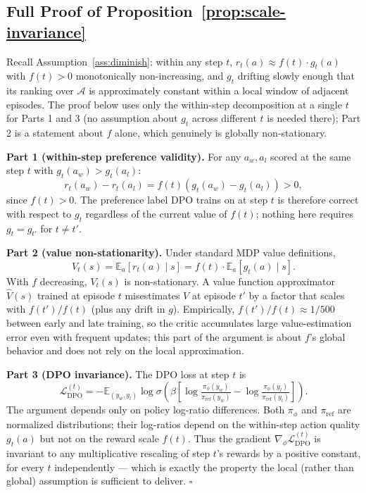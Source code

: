 \subsection{Full Proof of Proposition~\ref{prop:scale-invariance}}
\label{app:proof}

Recall Assumption~\ref{ass:diminish}: within any step $t$, $r_t(a) \approx f(t) \cdot g_t(a)$ with $f(t) > 0$ monotonically non-increasing, and $g_t$ drifting slowly enough that its ranking over $\mathcal{A}$ is approximately constant within a local window of adjacent episodes. The proof below uses only the within-step decomposition at a single $t$ for Parts 1 and 3 (no assumption about $g_t$ across different $t$ is needed there); Part 2 is a statement about $f$ alone, which genuinely is globally non-stationary.

\textbf{Part 1 (within-step preference validity).} For any $a_w, a_l$ scored at the same step $t$ with $g_t(a_w) > g_t(a_l)$:
\[r_t(a_w) - r_t(a_l) = f(t)(g_t(a_w) - g_t(a_l)) > 0,\]
since $f(t) > 0$. The preference label DPO trains on at step $t$ is therefore correct with respect to $g_t$ regardless of the current value of $f(t)$; nothing here requires $g_t = g_{t'}$ for $t \ne t'$.

\textbf{Part 2 (value non-stationarity).} Under standard MDP value definitions,
\[V_t(s) = \mathbb{E}_a[r_t(a) \mid s] = f(t) \cdot \mathbb{E}_a[g_t(a) \mid s].\]
With $f$ decreasing, $V_t(s)$ is non-stationary. A value function approximator $\hat{V}(s)$ trained at episode $t$ misestimates $V$ at episode $t'$ by a factor that scales with $f(t')/f(t)$ (plus any drift in $g$). Empirically, $f(t')/f(t) \approx 1/500$ between early and late training, so the critic accumulates large value-estimation error even with frequent updates; this part of the argument is about $f$'s global behavior and does not rely on the local approximation.

\textbf{Part 3 (DPO invariance).} The DPO loss at step $t$ is
\[\mathcal{L}_\text{DPO}^{(t)} = -\mathbb{E}_{(y_w, y_l)} \log \sigma\!\left(\beta \left[\log\tfrac{\pi_\phi(y_w)}{\pi_\text{ref}(y_w)} - \log\tfrac{\pi_\phi(y_l)}{\pi_\text{ref}(y_l)}\right]\right).\]
The argument depends only on policy log-ratio differences. Both $\pi_\phi$ and $\pi_\text{ref}$ are normalized distributions; their log-ratios depend on the within-step action quality $g_t(a)$ but not on the reward scale $f(t)$. Thus the gradient $\nabla_\phi \mathcal{L}_\text{DPO}^{(t)}$ is invariant to any multiplicative rescaling of step $t$'s rewards by a positive constant, for every $t$ independently --- which is exactly the property the local (rather than global) assumption is sufficient to deliver. \hfill$\square$

